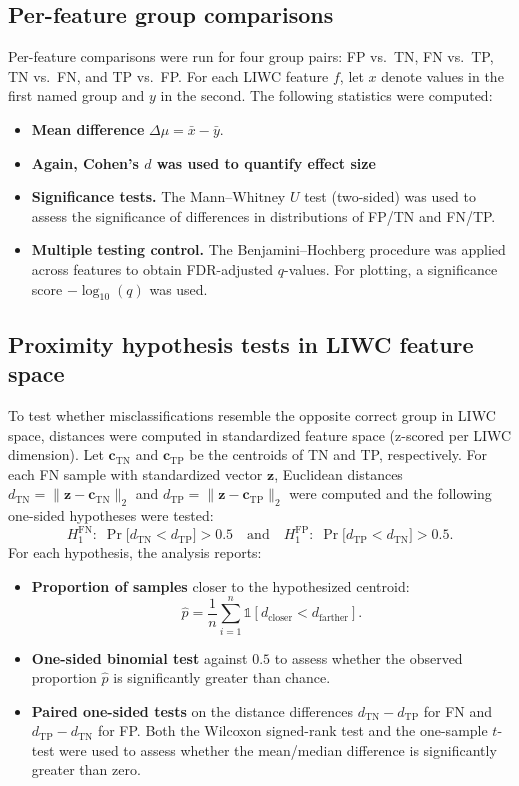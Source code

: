 \subsection{Per-feature group comparisons}
Per-feature comparisons were run for four group pairs: FP vs.\ TN, FN vs.\ TP, TN vs.\ FN, and TP vs.\ FP. For each LIWC feature \(f\), let \(x\) denote values in the first named group and \(y\) in the second. The following statistics were computed:

\begin{itemize}
\item \textbf{Mean difference} \(\Delta\mu = \bar{x} - \bar{y}\).
\item \textbf{Again, Cohen's \(d\)  was used to quantify effect size}
\item \textbf{Significance tests.} The Mann–Whitney \(U\) test (two-sided) was used to assess the significance of differences in distributions of FP/TN and FN/TP.
\item \textbf{Multiple testing control.} The Benjamini–Hochberg procedure was applied across features to obtain FDR-adjusted \(q\)-values. For plotting, a significance score \(-\log_{10}(q)\) was used.
\end{itemize}


\subsection{Proximity hypothesis tests in LIWC feature space}
To test whether misclassifications resemble the opposite correct group in LIWC space, distances were computed in standardized feature space (z-scored per LIWC dimension). Let \(\mathbf{c}_{\mathrm{TN}}\) and \(\mathbf{c}_{\mathrm{TP}}\) be the centroids of TN and TP, respectively. For each FN sample with standardized vector \(\mathbf{z}\), Euclidean distances
\(d_{\mathrm{TN}} = \|\mathbf{z}-\mathbf{c}_{\mathrm{TN}}\|_2\) and
\(d_{\mathrm{TP}} = \|\mathbf{z}-\mathbf{c}_{\mathrm{TP}}\|_2\) were computed and the following one-sided hypotheses were tested:
\[
H_{1}^{\mathrm{FN}}:\; \Pr\!\big[d_{\mathrm{TN}} < d_{\mathrm{TP}}\big] > 0.5
\quad\text{and}\quad
H_{1}^{\mathrm{FP}}:\; \Pr\!\big[d_{\mathrm{TP}} < d_{\mathrm{TN}}\big] > 0.5.
\]
For each hypothesis, the analysis reports:

\begin{itemize}
  \item \textbf{Proportion of samples} closer to the hypothesized centroid:
  \[\hat{p} = \frac{1}{n}\sum_{i=1}^{n} \mathbb{1}[d_{\text{closer}} < d_{\text{farther}}].\]
  \item \textbf{One-sided binomial test} against \(0.5\) to assess whether the observed proportion \(\hat{p}\) is significantly greater than chance.
  \item \textbf{Paired one-sided tests} on the distance differences \(d_{\mathrm{TN}} - d_{\mathrm{TP}}\) for FN and \(d_{\mathrm{TP}} - d_{\mathrm{TN}}\) for FP. Both the Wilcoxon signed-rank test and the one-sample \(t\)-test were used to assess whether the mean/median difference is significantly greater than zero.
\end{itemize}

